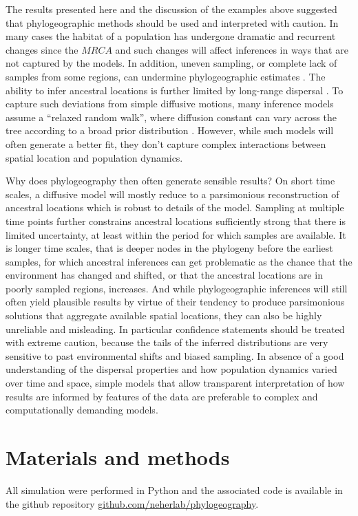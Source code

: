 \documentclass[aps,rmp, twocolumn]{revtex4}
\begin{document}
The results presented here and the discussion of the examples above suggested that phylogeographic methods should be used and interpreted with caution.
In many cases the habitat of a population has undergone dramatic and recurrent changes since the $MRCA$ and such changes will affect inferences in ways that are not captured by the models.
In addition, uneven sampling, or complete lack of samples from some regions, can undermine phylogeographic estimates \citep{kalkauskas_sampling_2021,layan_impact_2023}.
The ability to infer ancestral locations is further limited by long-range dispersal \citep{hallatschek_acceleration_2014}.
To capture such deviations from simple diffusive motions, many inference models assume a ``relaxed random walk'', where diffusion constant can vary across the tree according to a broad prior distribution \citep{dellicour_relax_2021}.
However, while such models will often generate a better fit, they don't capture complex interactions between spatial location and population dynamics.

Why does phylogeography then often generate sensible results?
On short time scales, a diffusive model will mostly reduce to a parsimonious reconstruction of ancestral locations which is robust to details of the model.
Sampling at multiple time points further constrains ancestral locations sufficiently strong that there is limited uncertainty, at least within the period for which samples are available.
It is longer time scales, that is deeper nodes in the phylogeny before the earliest samples, for which ancestral inferences can get problematic as the chance that the environment has changed and shifted, or that the ancestral locations are in poorly sampled regions, increases.
And while phylogeographic inferences will still often yield plausible results by virtue of their tendency to produce parsimonious solutions that aggregate available spatial locations, they can also be highly unreliable and misleading.
In particular confidence statements should be treated with extreme caution, because the tails of the inferred distributions are very sensitive to past environmental shifts and biased sampling.
In absence of a good understanding of the dispersal properties and how population dynamics varied over time and space, simple models that allow transparent interpretation of how results are informed by features of the data are preferable to complex and computationally demanding models.

\section*{Materials and methods}
All simulation were performed in Python and the associated code is available in the github repository \href{https://github.com/neherlab/phylogeography}{github.com/neherlab/phylogeography}.


\end{document}
